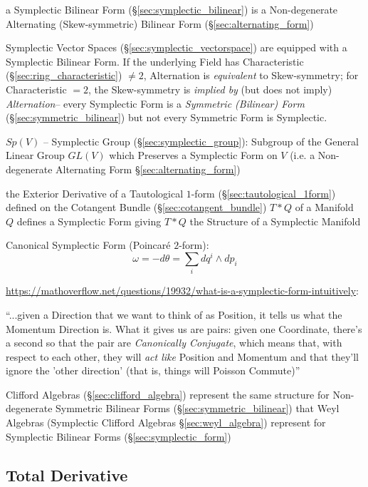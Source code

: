 a Symplectic Bilinear Form (\S\ref{sec:symplectic_bilinear}) is a
Non-degenerate Alternating (Skew-symmetric) Bilinear Form
(\S\ref{sec:alternating_form})

Symplectic Vector Spaces (\S\ref{sec:symplectic_vectorspace}) are equipped with
a Symplectic Bilinear Form. If the underlying Field has Characteristic
(\S\ref{sec:ring_characteristic}) $\neq 2$, Alternation is \emph{equivalent} to
Skew-symmetry; for Characteristic $=2$, the Skew-symmetry is \emph{implied by}
(but does not imply) \emph{Alternation}-- every Symplectic Form is a
\emph{Symmetric (Bilinear) Form} (\S\ref{sec:symmetric_bilinear}) but not
every Symmetric Form is Symplectic.

$Sp(V)$ -- Symplectic Group (\S\ref{sec:symplectic_group}): Subgroup of the
General Linear Group $GL(V)$ which Preserves a Symplectic Form on $V$ (i.e. a
Non-degenerate Alternating Form \S\ref{sec:alternating_form})

the Exterior Derivative of a Tautological $1$-form
(\S\ref{sec:tautological_1form}) defined on the Cotangent Bundle
(\S\ref{sec:cotangent_bundle}) $T * Q$ of a Manifold $Q$ defines a Symplectic
Form giving $T * Q$ the Structure of a Symplectic Manifold

Canonical Symplectic Form (Poincar\'e $2$-form):
\[
  \omega = -d\theta = \sum_i dq^i \wedge dp_i
\]

\asterism

\url{https://mathoverflow.net/questions/19932/what-is-a-symplectic-form-intuitively}:

``...given a Direction that we want to think of as Position, it tells us what
the Momentum Direction is. What it gives us are pairs: given one Coordinate,
there's a second so that the pair are \emph{Canonically Conjugate}, which means
that, with respect to each other, they will \emph{act like} Position and
Momentum and that they'll ignore the 'other direction' (that is, things will
Poisson Commute)''

\asterism

Clifford Algebras (\S\ref{sec:clifford_algebra}) represent the same structure
for Non-degenerate Symmetric Bilinear Forms (\S\ref{sec:symmetric_bilinear})
that Weyl Algebras (Symplectic Clifford Algebras \S\ref{sec:weyl_algebra})
represent for Symplectic Bilinear Forms (\S\ref{sec:symplectic_form})



\subsection{Total Derivative}\label{sec:total_derivative}

